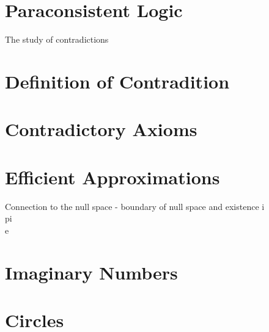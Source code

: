 \documentclass[11pt]{article}
\begin{document}
\section*{Paraconsistent Logic}
The study of contradictions


\section{Definition of Contradition}

\section{Contradictory Axioms}

\section{Efficient Approximations}
Connection to the null space - boundary of null space and existence
i \\
pi \\ 
e



\section{Imaginary Numbers}

\section{Circles}
\end{document}
